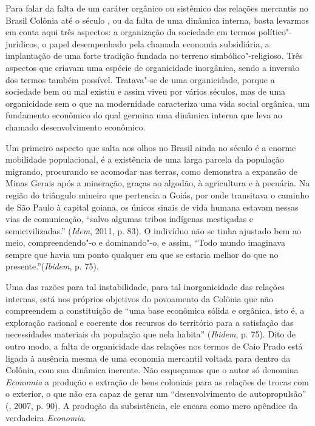 Para falar da falta de um caráter orgânico ou sistêmico das relações
mercantis no Brasil Colônia até o século , ou da falta de uma
dinâmica interna, basta levarmos em conta aqui três aspectos: a
organização da sociedade em termos político"-jurídicos, o papel
desempenhado pela chamada economia subsidiária, a implantação de uma
forte tradição fundada no terreno simbólico"-religioso. Três aspectos que
criavam uma espécie de organicidade inorgânica, sendo a inversão dos
termos também possível. Tratava"-se de uma organicidade, porque a
sociedade bem ou mal existiu e assim viveu por vários séculos,
mas de uma organicidade sem o que na modernidade caracteriza
uma vida social orgânica, um fundamento econômico do qual germina uma
dinâmica interna que leva ao chamado desenvolvimento econômico.

Um primeiro aspecto que salta aos olhos no Brasil ainda no século  é
a enorme mobilidade populacional, é a existência de uma larga parcela da
população migrando, procurando se acomodar nas terras, como demonstra a
expansão de Minas Gerais após a mineração, graças ao algodão, à
agricultura e à pecuária. Na região do triângulo mineiro que pertencia a
Goiás, por onde transitava o caminho de São Paulo à capital goiana, os
únicos sinais de vida humana estavam nessas vias de comunicação, ``salvo
algumas tribos indígenas mestiçadas e semicivilizadas.'' (\emph{Idem},
2011, p. 83). O indivíduo não se tinha ajustado bem ao meio,
compreendendo"-o e dominando"-o, e assim, ``Todo mundo imaginava sempre
que havia um ponto qualquer em que se estaria melhor do que no
presente.''(\emph{Ibidem}, p. 75).

Uma das razões para tal instabilidade, para tal inorganicidade das
relações internas, está nos próprios objetivos do povoamento da Colônia
que não compreendem a constituição de ``uma base econômica sólida e
orgânica, isto é, a exploração racional e coerente dos recursos do
território para a satisfação das necessidades materiais da população que
nela habita'' (\emph{Ibidem}, p. 75). Dito de outro modo, a falta
de organicidade das relações nos termos de Caio Prado está ligada à
ausência mesma de uma economia mercantil voltada para dentro da Colônia,
com sua dinâmica inerente. Não esqueçamos que o autor só denomina
\emph{Economia} a produção e extração de bens coloniais para as relações
de trocas com o exterior, o que não era capaz de gerar um
``desenvolvimento de autopropulsão'' (, 2007, p. 90). A produção
da subsistência, ele encara como mero apêndice da verdadeira
\emph{Economia}.


